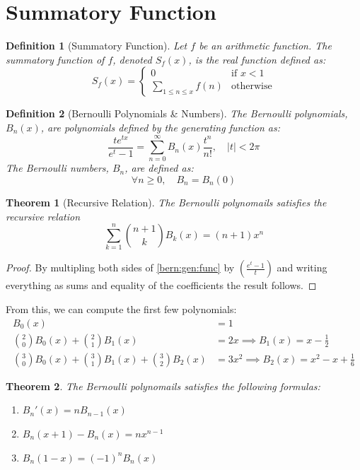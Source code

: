 \documentclass{article}
\newtheorem{thm}{Theorem}
\newtheorem{defn}{Definition}
\begin{document}
\section{Summatory Function}

\begin{defn}[Summatory Function]
Let $f$ be an arithmetic function. The summatory function of $f$, denoted $S_f(x)$, is the real function defined as:
$$
S_f(x) = 
\begin{cases} 
0 & \text{if } x < 1 \\ 
\sum\limits_{1 \le n \le x} f(n) & \text{otherwise} 
\end{cases}
$$
\end{defn}

\begin{defn}[Bernoulli Polynomials \& Numbers]
The Bernoulli polynomials, $B_n(x)$, are polynomials defined by the generating function as:
\begin{equation}\label{bern:gen:func}
\frac{t e^{tx}}{e^t - 1} = \sum_{n=0}^{\infty} B_n(x) \frac{t^n}{n!}, \quad |t| < 2\pi
\end{equation}
The Bernoulli numbers, $B_n$, are defined as:
$$
\forall n \ge 0, \quad B_n = B_n(0)
$$
\end{defn}

\begin{thm}[Recursive Relation]
	The Bernoulli polynomails satisfies the recursive relation
	$$
	\sum\limits_{k = 1}^{n} \binom{n + 1}{k}B_k(x) = \left( n + 1 \right)x^n
	$$
\end{thm}

\begin{proof}
	By multipling both sides of \eqref{bern:gen:func} by $(\frac{e^t - 1}{t})$ and writing everything as sums and equality of the coefficients the result follows.
\end{proof}

From this, we can compute the first few polynomials:
\begin{align*}
B_0(x) &= 1 \\
\binom{2}{0}B_0(x) + \binom{2}{1}B_1(x) &= 2x \implies B_1(x) = x - \frac{1}{2} \\
\binom{3}{0}B_0(x) + \binom{3}{1}B_1(x) + \binom{3}{2}B_2(x) &= 3x^2 \implies B_2(x) = x^2 - x + \frac{1}{6}
\end{align*}

\medskip

\begin{thm} The Bernoulli polynomails satisfies the following formulas:
\begin{enumerate}
    \item $B_n'(x) = n B_{n-1}(x)$
    \item $B_n(x+1) - B_n(x) = n x^{n-1}$
    \item $B_n(1-x) = (-1)^n B_n(x)$
\end{enumerate}
\end{thm}
\end{document}
